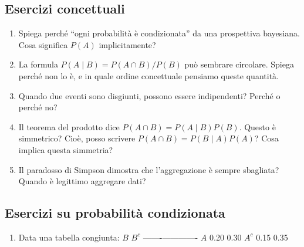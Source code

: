 \documentclass[
  letterpaper,
  DIV=11,
  numbers=noendperiod,
  oneside]{scrreprt}
\theoremstyle{definition}
\theoremstyle{plain}
\theoremstyle{definition}
\theoremstyle{remark}
\begin{document}

\begin{tcolorbox}[enhanced jigsaw, arc=.35mm, breakable, colbacktitle=quarto-callout-important-color!10!white, opacityback=0, toprule=.15mm, rightrule=.15mm, colback=white, opacitybacktitle=0.6, leftrule=.75mm, coltitle=black, bottomtitle=1mm, left=2mm, toptitle=1mm, title=\textcolor{quarto-callout-important-color}{\faExclamation}\hspace{0.5em}{Problemi}, titlerule=0mm, bottomrule=.15mm, colframe=quarto-callout-important-color-frame]

\subsection{Esercizi concettuali}\label{esercizi-concettuali}

\begin{enumerate}
\def\labelenumi{\arabic{enumi}.}
\item
  Spiega perché ``ogni probabilità è condizionata'' da una prospettiva
  bayesiana. Cosa significa \(P(A)\) implicitamente?
\item
  La formula \(P(A \mid B) = P(A \cap B) / P(B)\) può sembrare
  circolare. Spiega perché non lo è, e in quale ordine concettuale
  pensiamo queste quantità.
\item
  Quando due eventi sono disgiunti, possono essere indipendenti? Perché
  o perché no?
\item
  Il teorema del prodotto dice \(P(A \cap B) = P(A \mid B) P(B)\).
  Questo è simmetrico? Cioè, posso scrivere
  \(P(A \cap B) = P(B \mid A) P(A)\)? Cosa implica questa simmetria?
\item
  Il paradosso di Simpson dimostra che l'aggregazione è sempre
  sbagliata? Quando è legittimo aggregare dati?
\end{enumerate}

\subsection{Esercizi su probabilità
condizionata}\label{esercizi-su-probabilituxe0-condizionata}

\begin{enumerate}
\def\labelenumi{\arabic{enumi}.}
\setcounter{enumi}{5}
\item
  Data una tabella congiunta: \textbar{} \textbar{} \(B\) \textbar{}
  \(B^c\) \textbar{}
  \textbar-------\textbar------\textbar-------\textbar{} \textbar{}
  \(A\) \textbar{} 0.20 \textbar{} 0.30 \textbar{} \textbar{} \(A^c\)
  \textbar{} 0.15 \textbar{} 0.35 \textbar{}


\end{enumerate}
\end{tcolorbox}
\end{document}
